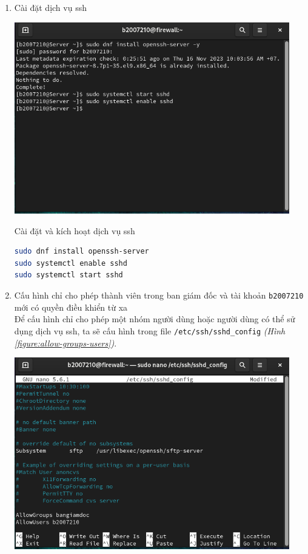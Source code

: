 \documentclass[a4paper, 11pt]{article}
\begin{document}
\begin{enumerate}
    \item Cài đặt dịch vụ ssh \hfill \\
          \begin{minipage}
              {\linewidth}
              \captionsetup{type=figure}
              \centering
              \includegraphics[width=12cm]{images/install-ssh.png}
              \caption{Cài đặt và kích hoạt dịch vụ ssh}
              \label{figure:install-ssh}
          \end{minipage}
          \begin{lstlisting}[language=bash, caption=Cài đặt và kích hoạt dịch vụ ssh]
sudo dnf install openssh-server
sudo systemctl enable sshd
sudo systemctl start sshd
\end{lstlisting}
    \item Cấu hình chỉ cho phép thành viên trong ban giám đốc và tài khoản \texttt{b2007210} mới có quyền điều khiển từ xa \hfill \\
          Để cấu hình chỉ cho phép một nhóm người dùng hoặc người dùng có thể sử dụng dịch vụ ssh, ta sẽ cấu hình trong file \texttt{/etc/ssh/sshd\_config} \textit{(Hình \ref{figure:allow-groups-users})}. \\
          \begin{minipage}
              {\linewidth}
              \captionsetup{type=figure}
              \centering
              \includegraphics[width=12cm]{images/allow-groups-users.png}

\end{minipage}
\end{enumerate}
\end{document}
